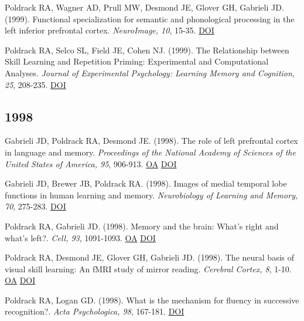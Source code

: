 \documentclass[10pt, letterpaper]{article}
\begin{document}
Poldrack RA, Wagner AD, Prull MW, Desmond JE, Glover GH, Gabrieli JD.  (1999). Functional specialization for semantic and phonological processing in the left inferior prefrontal cortex. \textit{NeuroImage, 10}, 15-35. \href{https://doi.org/10.1006/nimg.1999.0441}{DOI} \vspace{2mm}

Poldrack RA, Selco SL, Field JE, Cohen NJ.  (1999). The Relationship between Skill Learning and Repetition Priming: Experimental and Computational Analyses. \textit{Journal of Experimental Psychology: Learning Memory and Cognition, 25}, 208-235. \href{https://doi.org/10.1037/0278-7393.25.1.208}{DOI} \vspace{2mm}

\subsection*{1998}Gabrieli JD, Poldrack RA, Desmond JE.  (1998). The role of left prefrontal cortex in language and memory. \textit{Proceedings of the National Academy of Sciences of the United States of America, 95}, 906-913. \href{https://www.ncbi.nlm.nih.gov/pmc/articles/PMC33815}{OA} \href{https://doi.org/10.1073/pnas.95.3.906}{DOI} \vspace{2mm}

Gabrieli JD, Brewer JB, Poldrack RA.  (1998). Images of medial temporal lobe functions in human learning and memory. \textit{Neurobiology of Learning and Memory, 70}, 275-283. \href{https://doi.org/10.1006/nlme.1998.3853}{DOI} \vspace{2mm}

Poldrack RA, Gabrieli JD.  (1998). Memory and the brain: What's right and what's left?. \textit{Cell, 93}, 1091-1093. \href{https://doi.org/10.1016/s0092-8674(00)81451-8}{OA} \href{https://doi.org/10.1016/s0092-8674(00)81451-8}{DOI} \vspace{2mm}

Poldrack RA, Desmond JE, Glover GH, Gabrieli JD.  (1998). The neural basis of visual skill learning: An fMRI study of mirror reading. \textit{Cerebral Cortex, 8}, 1-10. \href{https://doi.org/10.1093/cercor/8.1.1}{OA} \href{https://doi.org/10.1093/cercor/8.1.1}{DOI} \vspace{2mm}

Poldrack RA, Logan GD.  (1998). What is the mechanism for fluency in successive recognition?. \textit{Acta Psychologica, 98}, 167-181. \href{https://doi.org/10.1016/s0001-6918(97)00041-3}{DOI} \vspace{2mm}
\end{document}
